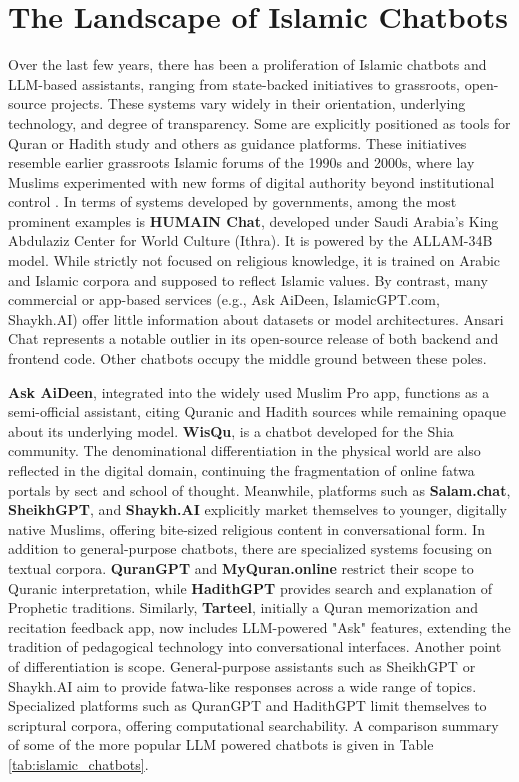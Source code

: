 \documentclass{article}
\begin{document}
\section{The Landscape of Islamic Chatbots}
Over the last few years, there has been a proliferation of Islamic chatbots and LLM-based assistants, ranging from state-backed initiatives to grassroots, open-source projects. These systems vary widely in their orientation, underlying technology, and degree of transparency. Some are explicitly positioned as tools for Quran or Hadith study and others as guidance platforms. These initiatives resemble earlier grassroots Islamic forums of the 1990s and 2000s, where lay Muslims experimented with new forms of digital authority beyond institutional control \citep{bunt2009}. In terms of systems developed by governments, among the most prominent examples is \textbf{HUMAIN Chat}, developed under Saudi Arabia's King Abdulaziz Center for World Culture (Ithra). It is powered by the ALLAM-34B model. While strictly not focused on religious knowledge, it is trained on Arabic and Islamic corpora and supposed to reflect Islamic values\citep{humain2024}. By contrast, many commercial or app-based services (e.g., Ask AiDeen, IslamicGPT.com, Shaykh.AI) offer little information about datasets or model architectures. Ansari Chat represents a notable outlier in its open-source release of both backend and frontend code.   Other chatbots occupy the middle ground between these poles. 

\textbf{Ask AiDeen}, integrated into the widely used Muslim Pro app, functions as a semi-official assistant, citing Quranic and Hadith sources while remaining opaque about its underlying model. \textbf{WisQu}, is a chatbot developed for the Shia community. The denominational differentiation in the physical world are also reflected in the digital domain, continuing the fragmentation of online fatwa portals  by sect and school of thought\citep{hirschkind2006, bunt2009}. Meanwhile, platforms such as \textbf{Salam.chat}, \textbf{SheikhGPT}, and \textbf{Shaykh.AI} explicitly market themselves to younger, digitally native Muslims, offering bite-sized religious content in conversational form. In addition to general-purpose chatbots, there are specialized systems focusing on textual corpora. \textbf{QuranGPT} and \textbf{MyQuran.online} restrict their scope to Quranic interpretation, while \textbf{HadithGPT} provides search and explanation of Prophetic traditions.  Similarly, \textbf{Tarteel}, initially a Quran memorization and recitation feedback app, now includes LLM-powered "Ask" features, extending the tradition of pedagogical technology into conversational interfaces. Another point of differentiation is scope. General-purpose assistants such as SheikhGPT or Shaykh.AI aim to provide fatwa-like responses across a wide range of topics. Specialized platforms such as QuranGPT and HadithGPT limit themselves to scriptural corpora, offering computational searchability.  A comparison summary of some of the more popular LLM powered chatbots is given in Table \ref{tab:islamic_chatbots}.
\end{document}
